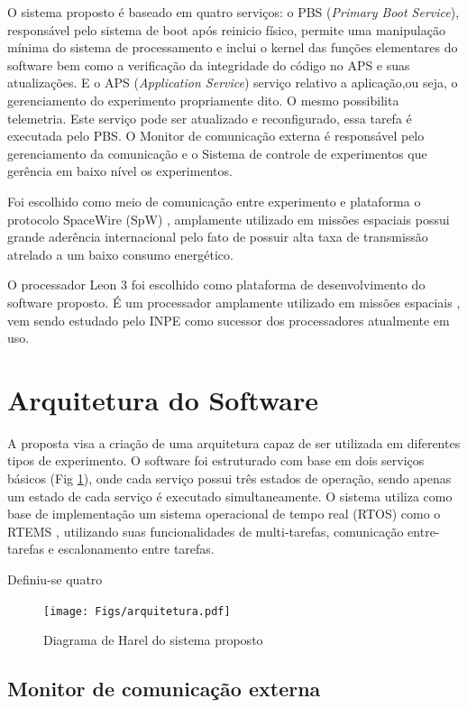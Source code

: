 \documentclass[journal,a4paper,oneside,twocolumn]{IEEEtran}
\begin{document}
	 O sistema proposto é baseado em quatro serviços:  o PBS (\textit{Primary Boot Service}), responsável pelo sistema de boot após reinicio físico, permite uma manipulação mínima do sistema de processamento e inclui o kernel das funções elementares	 do software bem como a verificação da integridade do código no APS e suas atualizações. E o APS (\textit{Application Service}) serviço relativo a aplicação,ou seja, o gerenciamento do experimento propriamente dito. O mesmo possibilita telemetria. Este serviço pode ser atualizado e reconfigurado, essa tarefa é executada pelo PBS. O Monitor de comunicação externa é responsável pelo gerenciamento da comunicação e o Sistema de controle de experimentos que gerência em baixo nível os experimentos.
	 
	 Foi escolhido como meio de comunicação entre experimento e plataforma o protocolo SpaceWire (SpW) \cite{SpW}, amplamente utilizado em missões espaciais possui grande aderência internacional pelo fato de possuir alta taxa de transmissão atrelado a um baixo consumo energético. 
	 
	O processador Leon 3 \cite{LEON3} foi escolhido como plataforma de desenvolvimento do software proposto. É um processador amplamente utilizado em missões espaciais \cite{abbasitabar2012susceptibility}, vem sendo estudado pelo INPE como  sucessor dos processadores atualmente em uso.
	
\section{Arquitetura do Software}
		
	A proposta visa a criação de uma arquitetura capaz de ser utilizada em diferentes tipos de experimento.   	
	O software foi estruturado com base em dois serviços básicos (Fig \ref{fig:arq}), onde cada serviço possui três estados de operação, sendo apenas um estado de cada serviço é executado simultaneamente. O sistema utiliza como base de implementação um sistema operacional de tempo real (RTOS) como o RTEMS \cite{zhang2010research}, utilizando suas funcionalidades de multi-tarefas, comunicação entre-tarefas e escalonamento entre tarefas.
	
	Definiu-se quatro 
	
	\begin{figure}[!t]
	\centering
	\texttt{[image: Figs/arquitetura.pdf]}
	\caption{Diagrama de Harel do sistema  proposto}
	\label{fig:arq}
	\end{figure}
	
\subsection{Monitor de comunicação externa}
	
\end{document}
